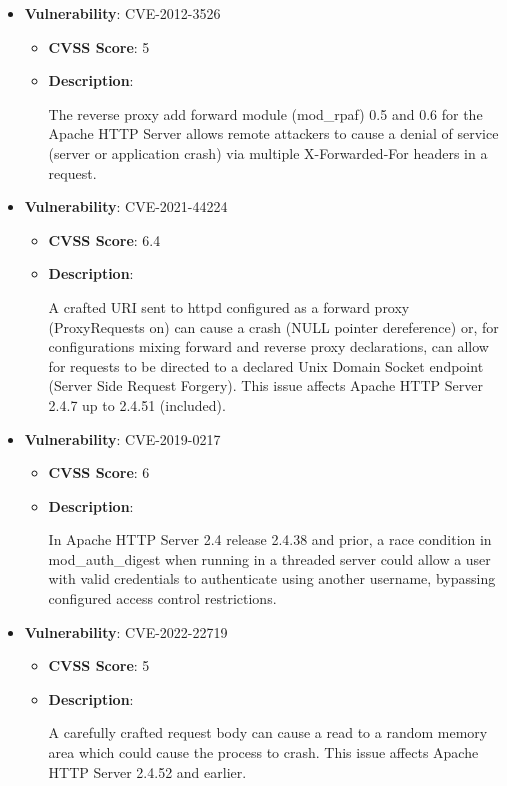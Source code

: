 \documentclass{article}
\begin{document}
\begin{itemize}
        \item \textbf{Vulnerability}: CVE-2012-3526
        \begin{itemize}
            \item \textbf{CVSS Score}:  5 
            \item \textbf{Description}:
            \parbox[t]{0.9\linewidth}{
                \ttfamily The reverse proxy add forward module (mod\_rpaf) 0.5 and 0.6 for the Apache HTTP Server allows remote attackers to cause a denial of service (server or application crash) via multiple X-Forwarded-For headers in a request.
            }
        \end{itemize}
    
        \item \textbf{Vulnerability}: CVE-2021-44224
        \begin{itemize}
            \item \textbf{CVSS Score}:  6.4 
            \item \textbf{Description}:
            \parbox[t]{0.9\linewidth}{
                \ttfamily A crafted URI sent to httpd configured as a forward proxy (ProxyRequests on) can cause a crash (NULL pointer dereference) or, for configurations mixing forward and reverse proxy declarations, can allow for requests to be directed to a declared Unix Domain Socket endpoint (Server Side Request Forgery). This issue affects Apache HTTP Server 2.4.7 up to 2.4.51 (included).
            }
        \end{itemize}
    
        \item \textbf{Vulnerability}: CVE-2019-0217
        \begin{itemize}
            \item \textbf{CVSS Score}:  6 
            \item \textbf{Description}:
            \parbox[t]{0.9\linewidth}{
                \ttfamily In Apache HTTP Server 2.4 release 2.4.38 and prior, a race condition in mod\_auth\_digest when running in a threaded server could allow a user with valid credentials to authenticate using another username, bypassing configured access control restrictions.
            }
        \end{itemize}
    
        \item \textbf{Vulnerability}: CVE-2022-22719
        \begin{itemize}
            \item \textbf{CVSS Score}:  5 
            \item \textbf{Description}:
            \parbox[t]{0.9\linewidth}{
                \ttfamily A carefully crafted request body can cause a read to a random memory area which could cause the process to crash. This issue affects Apache HTTP Server 2.4.52 and earlier.
            }
        \end{itemize}
    

\end{itemize}
\end{document}
